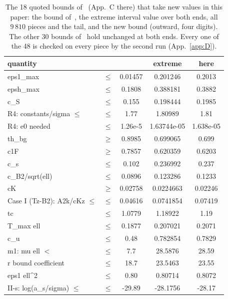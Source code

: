 \begin{table}
\caption{The 18 quoted bounds of~\cite{I} (App.~C there) that take new values in this paper: the bound of~\cite{I}, the extreme interval value over both ends, all $9\,810$ pieces and the tail, and the new bound (outward, four digits). The other 30 bounds of~\cite{I} hold unchanged at both ends. Every one of the 48 is checked on every piece by the second run (App.~\ref{app:D}).}
\label{tab:quoted}
\begin{ruledtabular}
\footnotesize
\begin{tabular}{p{}cccc}
quantity & & \cite{I} & extreme & here\\ \hline
eps1\_max & $\le$ & 0.01457 & 0.201246 & 0.2013\\
epsh\_max & $\le$ & 0.1808 & 0.388181 & 0.3882\\
c\_S & $\le$ & 0.155 & 0.198444 & 0.1985\\
R4: constants/sigma $\le$ & $\le$ & 1.77 & 1.80989 & 1.81\\
R4: e0 needed & $\le$ & 1.26e-5 & 1.63744e-05 & 1.638e-05\\
th\_bg & $\ge$ & 0.8985 & 0.699065 & 0.699\\
c1F & $\ge$ & 0.7857 & 0.620359 & 0.6203\\
c\_s & $\le$ & 0.102 & 0.236992 & 0.237\\
c\_B2/sqrt(ell) & $\le$ & 0.0896 & 0.123286 & 0.1233\\
cK & $\ge$ & 0.02758 & 0.0224663 & 0.02246\\
Case I (Tz-B2): A2k/cKz $\le$ & $\le$ & 0.04616 & 0.0741854 & 0.07419\\
tc & $\le$ & 1.0779 & 1.18922 & 1.19\\
T\_max ell & $\le$ & 0.1877 & 0.207021 & 0.2071\\
c\_u & $\le$ & 0.48 & 0.782854 & 0.7829\\
m1: mu ell $<$ & $\le$ & 7.7 & 28.5876 & 28.59\\
r bound coefficient & $\le$ & 18.7 & 23.5463 & 23.55\\
eps1 ell\^{}2 & $\le$ & 0.80 & 0.80714 & 0.8072\\
II-s: log(a\_s/sigma) $\le$ & $\le$ & -29.89 & -28.1756 & -28.17\\
\end{tabular}
\end{ruledtabular}
\end{table}
